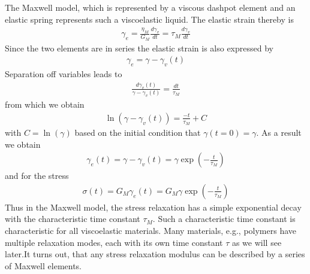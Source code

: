 \documentclass[letterpaper,10pt,english]{sphinxmanual}
\begin{document}
\sphinxAtStartPar
The Maxwell model, which is represented by a viscous dashpot element and an elastic spring represents such a viscoelastic liquid. The elastic strain thereby is
\begin{equation*}
\begin{split}\gamma_e=\frac{\eta_M}{G_M}\frac{d\gamma_v}{dt}=\tau_M\frac{d\gamma_v}{dt}\end{split}
\end{equation*}
\sphinxAtStartPar
Since the two elements are in series the elastic strain is also expressed by
\begin{equation*}
\begin{split}\gamma_e=\gamma-\gamma_v(t)\end{split}
\end{equation*}
\sphinxAtStartPar
Separation off variables leads to
\begin{equation*}
\begin{split}\frac{d\gamma_v(t)}{\gamma-\gamma_v(t)}=\frac{dt}{\tau_M}\end{split}
\end{equation*}
\sphinxAtStartPar
from which we obtain
\begin{equation*}
\begin{split}\ln(\gamma-\gamma_v(t))=\frac{-t}{\tau_M}+C\end{split}
\end{equation*}
\sphinxAtStartPar
with \(C=\ln(\gamma)\) based on the initial condition that \(\gamma(t=0)=\gamma\). As a result we obtain
\begin{equation*}
\begin{split}\gamma_e(t)=\gamma-\gamma_v(t)=\gamma \exp\left (- \frac{t}{\tau_M} \right )\end{split}
\end{equation*}
\sphinxAtStartPar
and for the stress
\begin{equation*}
\begin{split}\sigma(t)=G_M\gamma_e(t)=G_M \gamma \exp \left ( -\frac{t}{\tau_M}\right )\end{split}
\end{equation*}
\sphinxAtStartPar
Thus in the Maxwell model, the stress relaxation has a simple exponential decay with the characteristic time constant \(\tau_M\). Such a characteristic time constant is characteristic for all viscoelastic materials. Many materials, e.g., polymers have multiple relaxation modes, each with its own time constant \(\tau\) as we will see later.It turns out, that any stress relaxation modulus can be described by a series of Maxwell elements.
\end{document}
